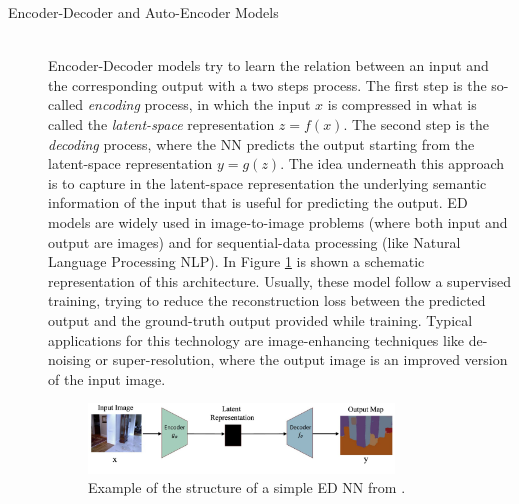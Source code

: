 \begin{description}
    \item [Encoder-Decoder and Auto-Encoder Models] \hfill \\
        Encoder-Decoder models try to learn the relation between an input and the corresponding output with a two steps process. The first step is the so-called \textit{encoding} process, in which the input $x$ is compressed in what is called the \textit{latent-space} representation $z = f(x)$. The second step is the \textit{decoding} process, where the NN predicts the output starting from the latent-space representation $ y = g(z)$. The idea underneath this approach is to capture in the latent-space representation the underlying semantic information of the input that is useful for predicting the output. ED models are widely used in image-to-image problems (where both input and output are images) and for sequential-data processing (like Natural Language Processing NLP). In Figure \ref{fig:EDNN} is shown a schematic representation of this architecture. Usually, these model follow a supervised training, trying to reduce the reconstruction loss between the predicted output and the ground-truth output provided while training. Typical applications for this technology are image-enhancing techniques like de-noising or super-resolution, where the output image is an improved version of the input image.

        \begin{figure}
            \centering
            \includegraphics[width = 0.8\textwidth]{images/EDnet}
            \caption{Example of the structure of a simple ED NN from  \cite{deep_seg_SOA}.}
            \label{fig:EDNN}
        \end{figure}


\end{description}
